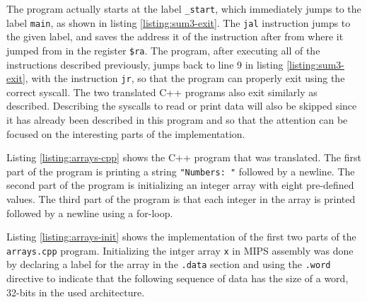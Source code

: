 \documentclass[11pt]{report}
\begin{document}
The program actually starts at the label \verb|_start|, which immediately jumps to the label
\verb|main|, as shown in listing \ref{listing:sum3-exit}. The \verb|jal| instruction jumps to the
given label, and saves the address it of the instruction after from where it jumped from in the
register \verb|$ra|. The program, after executing all of the instructions described previously,
jumps back to line 9 in listing \ref{listing:sum3-exit}, with the instruction \verb|jr|, so that the
program can properly exit using the correct syscall. The two translated C++ programs also exit
similarly as described. Describing the syscalls to read or print data will also be skipped since it
has already been described in this program and so that the attention can be focused on the
interesting parts of the implementation.


Listing \ref{listing:arrays-cpp} shows the C++ program that was translated. The first part of the
program is printing a string \verb|"Numbers: "| followed by a newline. The second part of the
program is initializing an integer array with eight pre-defined values. The third part of the
program is that each integer in the array is printed followed by a newline using a for-loop.

\newpage


Listing \ref{listing:arrays-init} shows the implementation of the first two parts of the
\verb|arrays.cpp| program. Initializing the intger array \verb|x| in MIPS assembly was done by
declaring a label for the array in the \verb|.data| section and using the \verb|.word| directive to
indicate that the following sequence of data has the size of a word, 32-bits in the used
architecture.

\end{document}
